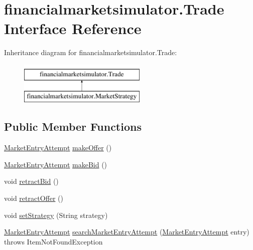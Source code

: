 \hypertarget{interfacefinancialmarketsimulator_1_1_trade}{\section{financialmarketsimulator.\+Trade Interface Reference}
\label{interfacefinancialmarketsimulator_1_1_trade}
}
Inheritance diagram for financialmarketsimulator.\+Trade\+:\begin{figure}[H]
\begin{center}
\leavevmode
\includegraphics[height=2.000000cm]{interfacefinancialmarketsimulator_1_1_trade}
\end{center}
\end{figure}
\subsection*{Public Member Functions}
\begin{DoxyCompactItemize}
\item 
\hyperlink{classfinancialmarketsimulator_1_1_market_entry_attempt}{Market\+Entry\+Attempt} \hyperlink{interfacefinancialmarketsimulator_1_1_trade_aba2e7742e3c7a477417abb741eb049af}{make\+Offer} ()
\item 
\hyperlink{classfinancialmarketsimulator_1_1_market_entry_attempt}{Market\+Entry\+Attempt} \hyperlink{interfacefinancialmarketsimulator_1_1_trade_ab84e578afb7f519b018ebc0ffaab4d2a}{make\+Bid} ()
\item 
void \hyperlink{interfacefinancialmarketsimulator_1_1_trade_a22d67d3c44faaf8fca8a4fd2d78a3e75}{retract\+Bid} ()
\item 
void \hyperlink{interfacefinancialmarketsimulator_1_1_trade_a1a1cbe142a99ac5e08872efea02239f7}{retract\+Offer} ()
\item 
void \hyperlink{interfacefinancialmarketsimulator_1_1_trade_aa3cfc0cff8e9a08e48cfd70ae870cb8b}{set\+Strategy} (String strategy)
\item 
\hyperlink{classfinancialmarketsimulator_1_1_market_entry_attempt}{Market\+Entry\+Attempt} \hyperlink{interfacefinancialmarketsimulator_1_1_trade_a2635502a77913bfa79d6a953ee7c3c1f}{search\+Market\+Entry\+Attempt} (\hyperlink{classfinancialmarketsimulator_1_1_market_entry_attempt}{Market\+Entry\+Attempt} entry)  throws Item\+Not\+Found\+Exception
\end{DoxyCompactItemize}


